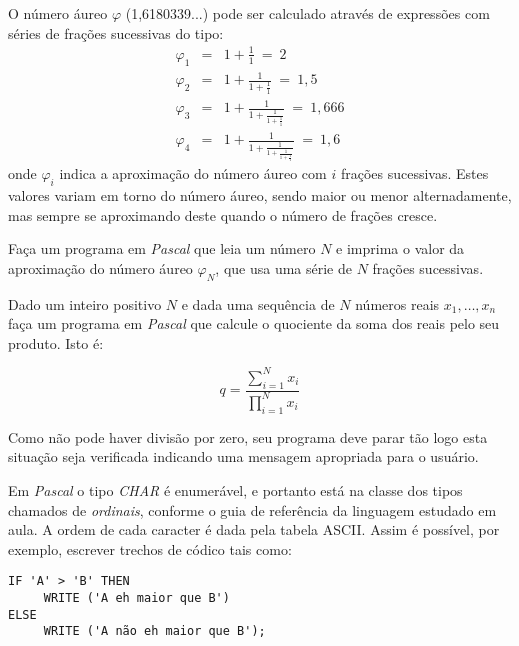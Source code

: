 \item O número áureo $\varphi$ (1,6180339...) pode ser calculado através de
expressões com séries de frações sucessivas do tipo:
\begin{eqnarray*}
   \varphi_1 &=& 1 + \frac{1}{1}\ =\ 2 \\
   \varphi_2 &=& 1 + \frac{1}{1 + \frac{1}{1}}\ =\ 1,5 \\
   \varphi_3 &=& 1 + \frac{1}{1 + \frac{1}{1 + \frac{1}{1}}}\ =\ 1,666 \\
   \varphi_4 &=& 1 + \frac{1}{1 + \frac{1}
                {1 + \frac{1}{1 + \frac{1}{1}}}}\ =\ 1,6
\end{eqnarray*}
onde $\varphi_i$ indica a aproximação do número áureo com $i$ frações
sucessivas. Estes valores variam em torno do número áureo, sendo maior ou
menor alternadamente, mas sempre se aproximando deste quando o número
de frações cresce.

Faça um programa em \emph{Pascal} que leia um número $N$ e imprima o
valor da aproximação do número áureo $\varphi_N$, que usa uma série de
$N$ frações sucessivas.

\item Dado um inteiro positivo $N$ e dada uma sequência de $N$ números reais $x_1, \ldots, x_n$
faça um programa em \emph{Pascal} que calcule o quociente da soma dos reais pelo seu produto. Isto é:

\[
q=\frac{\sum_{i=1}^{N}{x_i}}{\prod_{i=1}^{N}x_i}
\]

Como não pode haver divisão por zero, seu programa deve parar tão logo esta situação seja
verificada indicando uma mensagem apropriada para o usuário.

\item Em \emph{Pascal} o tipo \textit{CHAR} é enumerável, e portanto está na classe dos tipos
chamados de \textit{ordinais}, conforme o guia de referência da linguagem estudado em
aula. A ordem de cada caracter é dada pela tabela ASCII. Assim é possível, por exemplo, escrever
trechos de códico tais como:

\vspace*{\baselineskip}

\begin{center}
\begin{minipage}{8cm}
\begin{verbatim}
IF 'A' > 'B' THEN
     WRITE ('A eh maior que B')
ELSE
     WRITE ('A não eh maior que B');
\end{verbatim}
\end{minipage}
\end{center}


